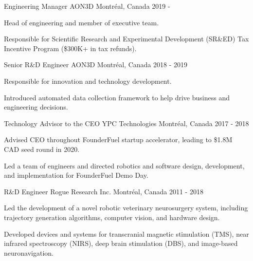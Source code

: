 \begin{cventries}

\cventry
{Engineering Manager}
{AON3D}
{Montréal, Canada}
{2019 - }
{
\begin{cvitems}
\item{Head of engineering and member of executive team.}
\item{Responsible for Scientific Research and Experimental Development (SR\&ED) Tax Incentive Program (\$300K+ in tax refunds).}
\end{cvitems}
}

\cventry
{Senior R\&D Engineer}
{AON3D}
{Montréal, Canada}
{2018 - 2019}
{
\begin{cvitems}
\item{Responsible for innovation and technology development.}
\item{Introduced automated data collection framework to help drive business and engineering decisions.}
\end{cvitems}
}

\cventry
{Technology Advisor to the CEO}
{YPC Technologies}
{Montréal, Canada}
{2017 - 2018}
{
\begin{cvitems}
\item{Advised CEO throughout FounderFuel startup accelerator, leading to \$1.8M CAD seed round in 2020.}
\item{Led a team of engineers and directed robotics and software design, development, and implementation for FounderFuel Demo Day.}
\end{cvitems}
}

\cventry
{R\&D Engineer}
{Rogue Research Inc.}
{Montréal, Canada}
{2011 - 2018}
{
\begin{cvitems}
\item{Led the development of a novel robotic veterinary neurosurgery system, including trajectory generation algorithms, computer vision, and hardware design.}
\item{Developed devices and systems for transcranial magnetic stimulation (TMS), near infrared spectroscopy (NIRS), deep brain stimulation (DBS), and image-based neuronavigation.}
\end{cvitems}
}

\end{cventries}
